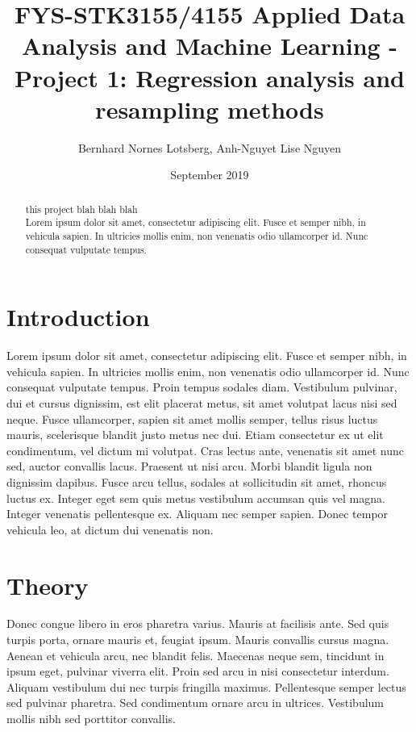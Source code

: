 \documentclass[a4paper, 11pt]{article}
\title{FYS-STK3155/4155 Applied Data Analysis and Machine Learning - Project 1: Regression analysis and resampling methods }
\author{Bernhard Nornes Lotsberg, Anh-Nguyet Lise Nguyen}
\date{September 2019}
\begin{document}
\maketitle


\begin{abstract} %
    this project blah blah blah\\
    Lorem ipsum dolor sit amet, consectetur adipiscing elit. Fusce et semper nibh, in vehicula sapien. In ultricies mollis enim, non venenatis odio ullamcorper id. Nunc consequat vulputate tempus.
\end{abstract}

\begin{multicols}{2}
\section{Introduction}
Lorem ipsum dolor sit amet, consectetur adipiscing elit. Fusce et semper nibh, in vehicula sapien. In ultricies mollis enim, non venenatis     odio ullamcorper id. Nunc consequat vulputate tempus. Proin tempus sodales diam. Vestibulum pulvinar, dui et cursus dignissim, est elit placerat metus, sit amet volutpat lacus nisi sed neque. Fusce ullamcorper, sapien sit amet mollis semper, tellus risus luctus mauris, scelerisque blandit justo metus nec dui. Etiam consectetur ex ut elit condimentum, vel dictum mi volutpat. Cras lectus ante, venenatis sit amet nunc sed, auctor convallis lacus. Praesent ut nisi arcu. Morbi blandit ligula non dignissim dapibus. Fusce arcu tellus, sodales at sollicitudin sit amet, rhoncus luctus ex. Integer eget sem quis metus vestibulum accumsan quis vel magna. Integer venenatis pellentesque ex. Aliquam nec semper sapien. Donec tempor vehicula leo, at dictum dui venenatis non.


\section{Theory}
Donec congue libero in eros pharetra varius. Mauris at facilisis ante. Sed quis turpis porta, ornare mauris et, feugiat ipsum. Mauris convallis cursus magna. Aenean et vehicula arcu, nec blandit felis. Maecenas neque sem, tincidunt in ipsum eget, pulvinar viverra elit. Proin sed arcu in nisi consectetur interdum. Aliquam vestibulum dui nec turpis fringilla maximus. Pellentesque semper lectus sed pulvinar pharetra. Sed condimentum ornare arcu in ultrices. Vestibulum mollis nibh sed porttitor convallis.


\end{multicols}
\end{document}
